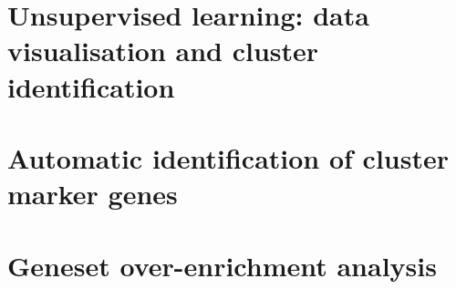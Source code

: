\section{Unsupervised learning: data visualisation and cluster identification}


\section{Automatic identification of cluster marker genes}


\section{Geneset over-enrichment analysis}


